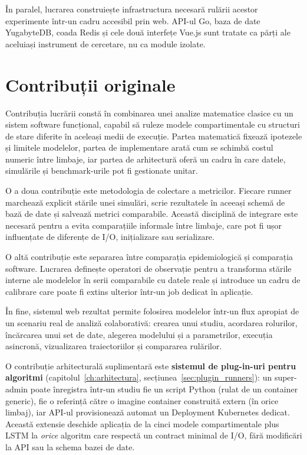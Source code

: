 În paralel, lucrarea construiește infrastructura necesară rulării acestor
experimente într-un cadru accesibil prin web. API-ul Go, baza de date
YugabyteDB, coada Redis și cele două interfețe Vue.js sunt tratate ca părți ale
aceluiași instrument de cercetare, nu ca module izolate.

{}
\section*{Contribuții originale}
\label{sec:contributii}

Contribuția lucrării constă în combinarea unei analize matematice clasice cu un
sistem software funcțional, capabil să ruleze modele compartimentale cu structuri
de stare diferite în aceleași medii de execuție. Partea matematică fixează
ipotezele și limitele modelelor, partea de implementare arată cum se schimbă
costul numeric între limbaje, iar partea de arhitectură oferă un cadru în care
datele, simulările și benchmark-urile pot fi gestionate unitar.

O a doua contribuție este metodologia de colectare a metricilor. Fiecare runner
marchează explicit stările unei simulări, scrie rezultatele în aceeași schemă de
bază de date și salvează metrici comparabile. Această disciplină de integrare este
necesară pentru a evita comparațiile informale între limbaje, care pot fi ușor
influențate de diferențe de I/O, inițializare sau serializare.

O altă contribuție este separarea între comparația epidemiologică și comparația
software. Lucrarea definește operatori de observație pentru a transforma stările
interne ale modelelor în serii comparabile cu datele reale și introduce un cadru
de calibrare care poate fi extins ulterior într-un job dedicat în aplicație.

În fine, sistemul web rezultat permite folosirea modelelor într-un flux apropiat
de un scenariu real de analiză colaborativă: crearea unui studiu, acordarea
rolurilor, încărcarea unui set de date, alegerea modelului și a parametrilor,
execuția asincronă, vizualizarea traiectoriilor și compararea rulărilor.

O contribuție arhitecturală suplimentară este \textbf{sistemul de plug-in-uri
pentru algoritmi} (capitolul~\ref{ch:arhitectura},
secțiunea~\ref{sec:plugin_runners}): un super-admin poate înregistra într-un
studiu fie un script Python (rulat de un container generic), fie o referință
către o imagine container construită extern (în orice limbaj), iar API-ul
provisionează automat un Deployment Kubernetes dedicat. Această extensie deschide
aplicația de la cinci modele compartimentale plus LSTM la \emph{orice} algoritm
care respectă un contract minimal de I/O, fără modificări la API sau la schema
bazei de date.

